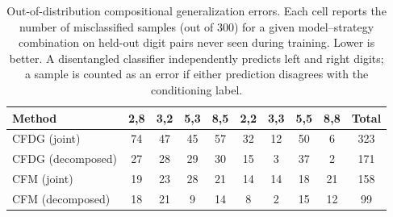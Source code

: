 \begin{table}[t]
\centering
\caption{Out-of-distribution compositional generalization errors. Each cell reports the number of misclassified samples (out of 300) for a given model--strategy combination on held-out digit pairs never seen during training. Lower is better. A disentangled classifier independently predicts left and right digits; a sample is counted as an error if either prediction disagrees with the conditioning label.}
\label{tab:ood-errors}
\begin{tabular}{lccccccccc}
\toprule
Method & \textbf{2,8} & \textbf{3,2} & \textbf{5,3} & \textbf{8,5} & \textbf{2,2} & \textbf{3,3} & \textbf{5,5} & \textbf{8,8} & Total \\
\midrule
CFDG (joint) & 74 & 47 & 45 & 57 & 32 & 12 & 50 & 6 & 323 \\
CFDG (decomposed) & 27 & 28 & 29 & 30 & 15 & 3 & 37 & 2 & 171 \\
CFM (joint) & 19 & 23 & 28 & 21 & 14 & 14 & 18 & 21 & 158 \\
CFM (decomposed) & 18 & 21 & 9 & 14 & 8 & 2 & 15 & 12 & 99 \\
\bottomrule
\end{tabular}
\end{table}